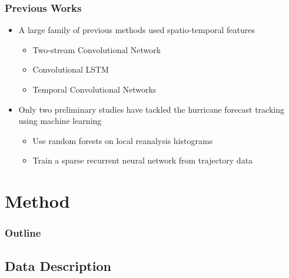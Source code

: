 \documentclass{beamer}
\begin{document}
\begin{frame}
\frametitle{Previous Works}
\begin{itemize}
\item A large family of previous methods used spatio-temporal features
\begin{itemize}
	\item Two-stream Convolutional Network
	\cite{simonyan2014two}
	\item Convolutional LSTM \cite{xingjian2015convolutional}
	\item Temporal Convolutional Networks \cite{lea2016temporal}
\end{itemize}
\item Only two preliminary studies have tackled the hurricane forecast tracking using machine learning
\begin{itemize}
	\item Use random forests on local reanalysis histograms \cite{liberge2011prevision}
	\item Train a sparse recurrent neural network from trajectory data \cite{moradi2016sparse}
\end{itemize}

\end{itemize}
\end{frame}
 
 \section{Method}
 \begin{frame}
 \frametitle{Outline} %
 \tableofcontents[currentsection] %
\end{frame}
\subsection{Data Description}
\end{document}

